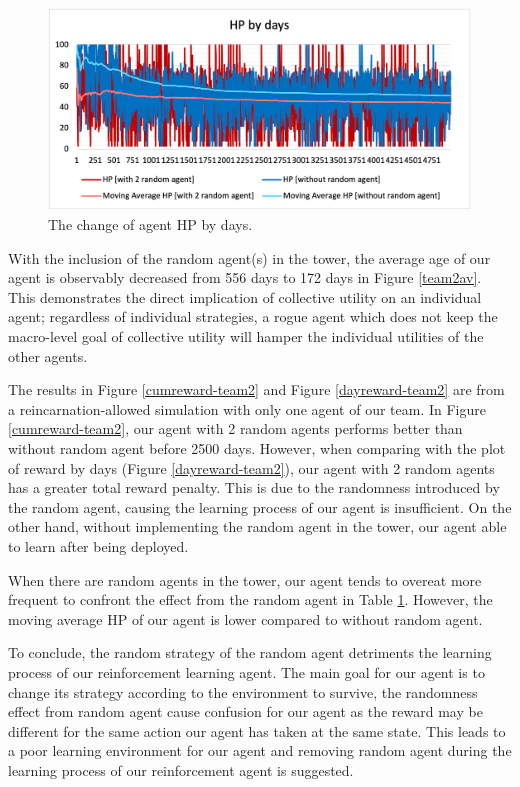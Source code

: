 \begin{figure}
\centering
\includegraphics{004_team_2_agent_design/hpchange}
\caption{The change of agent HP by days.}
\label{hpchange-team2}
\end{figure}

With the inclusion of the random agent(s) in the tower, the average age of our agent is observably decreased from 556 days to 172 days in Figure \ref{team2av}. This demonstrates the direct implication of collective utility on an individual agent; regardless of individual strategies, a rogue agent which does not keep the macro-level goal of collective utility will hamper the individual utilities of the other agents. 

The results in Figure \ref{cumreward-team2} and Figure \ref{dayreward-team2} are from a reincarnation-allowed simulation with only one agent of our team. In Figure \ref{cumreward-team2}, our agent with 2 random agents performs better than without random agent before 2500 days. However, when comparing with the plot of reward by days (Figure \ref{dayreward-team2}), our agent with 2 random agents has a greater total reward penalty. This is due to the randomness introduced by the random agent, causing the learning process of our agent is insufficient. On the other hand, without implementing the random agent in the tower, our agent able to learn after being deployed.

When there are random agents in the tower, our agent tends to overeat more frequent to confront the effect from the random agent in Table \ref{hpchange-team2}. However, the moving average HP of our agent is lower compared to without random agent.

To conclude, the random strategy of the random agent detriments the learning process of our reinforcement learning agent. The main goal for our agent is to change its strategy according to the environment to survive, the randomness effect from random agent cause confusion for our agent as the reward may be different for the same action our agent has taken at the same state. This leads to a poor learning environment for our agent and removing random agent during the learning process of our reinforcement agent is suggested.

